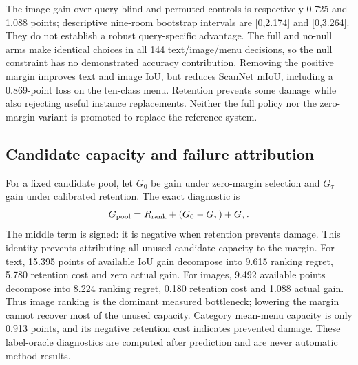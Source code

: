 The image gain over query-blind and permuted controls is respectively 0.725 and
1.088 points; descriptive nine-room bootstrap intervals are [0,2.174] and
[0,3.264]. They do not establish a robust query-specific advantage. The full
and no-null arms make identical choices in all 144 text/image/menu decisions,
so the null constraint has no demonstrated accuracy contribution. Removing the
positive margin improves text and image IoU, but reduces ScanNet mIoU, including
a 0.869-point loss on the ten-class menu. Retention prevents some damage while
also rejecting useful instance replacements. Neither the full policy nor the
zero-margin variant is promoted to replace the reference system.

\subsection{Candidate capacity and failure attribution}
For a fixed candidate pool, let $G_0$ be gain under zero-margin selection and
$G_\tau$ gain under calibrated retention. The exact diagnostic is
\[
G_{\rm pool}=R_{\rm rank}+(G_0-G_\tau)+G_\tau.
\]
The middle term is signed: it is negative when retention prevents damage.
This identity prevents attributing all unused candidate capacity to the margin.
For text, 15.395 points of available IoU gain decompose into 9.615 ranking regret,
5.780 retention cost and zero actual gain. For images, 9.492 available points
decompose into 8.224 ranking regret, 0.180 retention cost and 1.088 actual gain.
Thus image ranking is the dominant measured bottleneck; lowering the margin
cannot recover most of the unused capacity. Category mean-menu capacity is
only 0.913 points, and its negative retention cost indicates prevented damage.
These label-oracle diagnostics are computed after prediction and are never
automatic method results.

